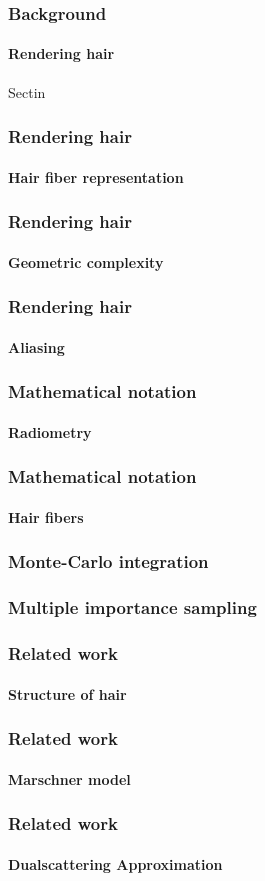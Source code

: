 \documentclass{beamer}
\begin{document}
  \begin{frame}
    \frametitle{Background}
	\framesubtitle{Rendering hair}
	
	Sectin
  \end{frame}
  
  \begin{frame}
    \frametitle{Rendering hair}
	\framesubtitle{Hair fiber representation}
	

  \end{frame}
  
  \begin{frame}
    \frametitle{Rendering hair}
	\framesubtitle{Geometric complexity}
	

  \end{frame}
  
  \begin{frame}
    \frametitle{Rendering hair}
	\framesubtitle{Aliasing}
	

  \end{frame}
  
  
  \begin{frame}
    \frametitle{Mathematical notation}
	\framesubtitle{Radiometry}
	

  \end{frame}
  
  \begin{frame}
    \frametitle{Mathematical notation}
	\framesubtitle{Hair fibers}
  \end{frame}
  
  
  \begin{frame}
    \frametitle{Monte-Carlo integration}
  \end{frame}
  
  \begin{frame}
    \frametitle{Multiple importance sampling}
  \end{frame}

  
  \begin{frame}
    \frametitle{Related work}
	\framesubtitle{Structure of hair}
  \end{frame}
  
  
  \begin{frame}
    \frametitle{Related work}
    \framesubtitle{Marschner model}
  \end{frame}
  
  \begin{frame}
    \frametitle{Related work}
    \framesubtitle{Dualscattering Approximation}
  \end{frame}
  
\end{document}
